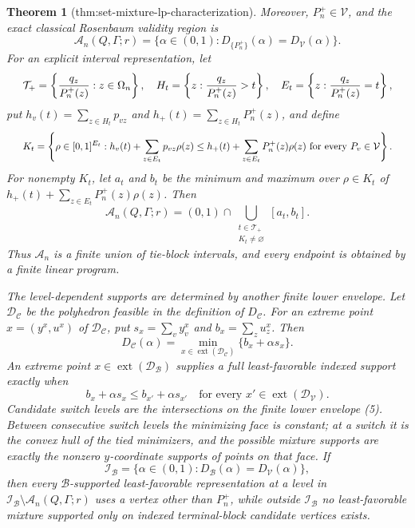 \documentclass{article}
\newtheorem{theorem}{Theorem}
\begin{document}
\begin{theorem}[thm:set-mixture-lp-characterization]
Moreover, \(P_n^+\in\mathcal V\), and the exact classical Rosenbaum validity region is
\[
 \mathcal A_n(Q,\Gamma;r)=\{\alpha\in(0,1):D_{\{P_n^+\}}(\alpha)=D_{\mathcal V}(\alpha)\}.\tag{3}
\]
For an explicit interval representation, let
\[
\makebox[\linewidth][c]{\resizebox{0.98\linewidth}{!}{\par\noindent \makebox[\linewidth][c]{\resizebox{0.98\linewidth}{!}{\(\displaystyle \displaystyle \mathcal T_+=\left\{\frac{q_z}{P_n^+(z)}:z\in\Omega_n\right\},\quad H_t=\left\{z:\frac{q_z}{P_n^+(z)}>t\right\},\quad E_t=\left\{z:\frac{q_z}{P_n^+(z)}=t\right\},\)}}\par\noindent}}
\]
put \(h_v(t)=\sum_{z\in H_t}p_{vz}\) and \(h_+(t)=\sum_{z\in H_t}P_n^+(z)\), and define
\[
\makebox[\linewidth][c]{\resizebox{0.98\linewidth}{!}{\par\noindent \makebox[\linewidth][c]{\resizebox{0.98\linewidth}{!}{\(\displaystyle \displaystyle K_t=\left\{\rho\in[0,1]^{E_t}:h_v(t)+\sum_{z\in E_t}p_{vz}\rho(z)\leq h_+(t)+\sum_{z\in E_t}P_n^+(z)\rho(z)\ \text{for every }P_v\in\mathcal V\right\}.\)}}\par\noindent}}
\]
For nonempty \(K_t\), let \(a_t\) and \(b_t\) be the minimum and maximum over \(\rho\in K_t\) of \(h_+(t)+\sum_{z\in E_t}P_n^+(z)\rho(z)\). Then
\[
 \mathcal A_n(Q,\Gamma;r)=(0,1)\cap\bigcup_{\substack{t\in\mathcal T_+\\K_t\neq\varnothing}}[a_t,b_t].\tag{4}
\]
Thus \(\mathcal A_n\) is a finite union of tie-block intervals, and every endpoint is obtained by a finite linear program.

The level-dependent supports are determined by another finite lower envelope. Let \(\mathcal D_{\mathcal C}\) be the polyhedron feasible in the definition of \(D_{\mathcal C}\). For an extreme point \(x=(y^x,u^x)\) of \(\mathcal D_{\mathcal C}\), put \(s_x=\sum_vy_v^x\) and \(b_x=\sum_zu_z^x\). Then
\[
 D_{\mathcal C}(\alpha)=\min_{x\in\operatorname{ext}(\mathcal D_{\mathcal C})}\{b_x+\alpha s_x\}.\tag{5}
\]
An extreme point \(x\in\operatorname{ext}(\mathcal D_{\mathcal B})\) supplies a full least-favorable indexed support exactly when
\[
 b_x+\alpha s_x\leq b_{x'}+\alpha s_{x'}\quad\text{for every }x'\in\operatorname{ext}(\mathcal D_{\mathcal V}).\tag{6}
\]
Candidate switch levels are the intersections on the finite lower envelope (5). Between consecutive switch levels the minimizing face is constant; at a switch it is the convex hull of the tied minimizers, and the possible mixture supports are exactly the nonzero \(y\)-coordinate supports of points on that face. If
\[
 \mathcal I_{\mathcal B}=\{\alpha\in(0,1):D_{\mathcal B}(\alpha)=D_{\mathcal V}(\alpha)\},
\]
then every \(\mathcal B\)-supported least-favorable representation at a level in \(\mathcal I_{\mathcal B}\setminus\mathcal A_n(Q,\Gamma;r)\) uses a vertex other than \(P_n^+\), while outside \(\mathcal I_{\mathcal B}\) no least-favorable mixture supported only on indexed terminal-block candidate vertices exists.


\end{theorem}
\end{document}
